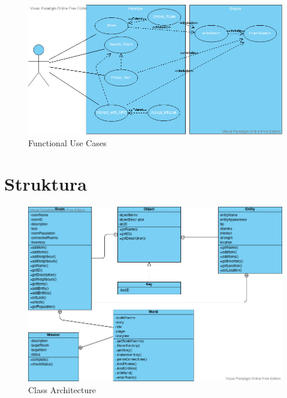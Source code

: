 \documentclass{scrarticle}
\begin{document}
\graphicspath{{../Planning/}}
\begin{figure}[H]\centering
    \includegraphics[width=1.0\columnwidth]{Functional_UseCase.jpg}
    \caption{Functional Use Cases}\label{fig:1}
\end{figure}

\section{Struktura}
\begin{figure}[H]
    \includegraphics[width=1.0\columnwidth]{Class_Architecture.jpg}
    \caption{Class Architecture}\label{fig:2}
\end{figure}
\end{document}
